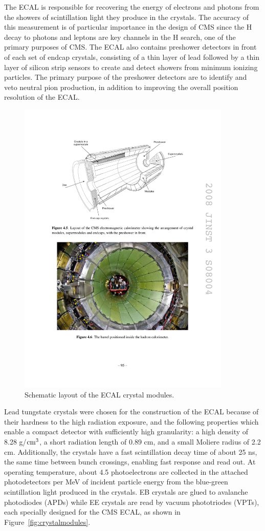 \indent The ECAL is responsible for recovering the energy of electrons and photons from the showers of scintillation light they produce in the crystals. The accuracy of this measurement is of particular importance in the design of CMS since the H decay to photons and leptons are key channels in the H search, one of the primary purposes of CMS. The ECAL also contains preshower detectors in front of each set of endcap crystals, consisting of a thin layer of lead followed by a thin layer of silicon strip sensors to create and detect showers from minimum ionizing particles. The primary purpose of the preshower detectors are to identify and veto neutral pion production, in addition to improving the overall position resolution of the ECAL.

\begin{figure}[tbh]
\centering
\includegraphics[width=4in]{figures/ecal.pdf}
\caption{Schematic layout of the ECAL crystal modules.}
\label{fig:ecal}
\end{figure}

\indent Lead tungstate crystals were chosen for the construction of the ECAL because of their hardness to the high radiation exposure, and the following properties which enable a compact detector with sufficiently high granularity: a high density of 8.28 g/$\rm{cm}^3$, a short radiation length of 0.89 cm, and a small Moliere radius of 2.2 cm. Additionally, the crystals have a fast scintillation decay time of about 25 ns, the same time between bunch crossings, enabling fast response and read out. At operating temperature, about 4.5 photoelectrons are collected in the attached photodetectors per MeV of incident particle energy from the blue-green scintillation light produced in the crystals. EB crystals are glued to avalanche photodiodes (APDs) while EE crystals are read by vacuum phototriodes (VPTs), each specially designed for the CMS ECAL, as shown in Figure~\ref{fig:crystalmodules}. 

